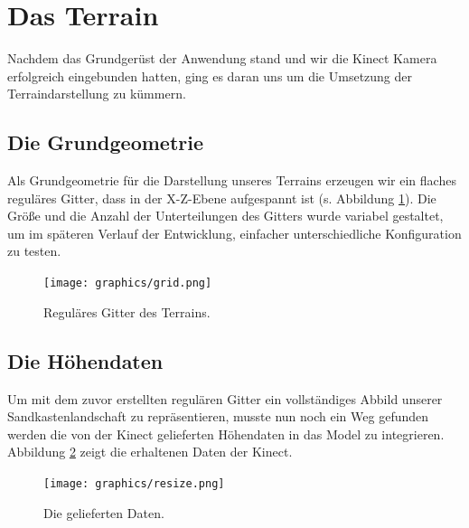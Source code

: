 \section{Das Terrain}
\begin{Spacing}{\mylinespace}

Nachdem das Grundgerüst der Anwendung stand und wir die Kinect Kamera erfolgreich eingebunden hatten, ging es daran uns um die Umsetzung der Terraindarstellung zu kümmern.

\subsection{Die Grundgeometrie}
Als Grundgeometrie für die Darstellung unseres Terrains erzeugen wir ein flaches reguläres Gitter, dass in der X-Z-Ebene aufgespannt ist (s. Abbildung \ref{fig:grid}). Die Größe und die Anzahl der Unterteilungen des Gitters wurde variabel gestaltet, um im späteren Verlauf der Entwicklung, einfacher unterschiedliche Konfiguration zu testen. 

\begin{figure}[h!]
	\centering
	\vspace*{10px}
	\texttt{[image: graphics/grid.png]}
	\caption{Reguläres Gitter des Terrains.}
	\label{fig:grid}
\end{figure}

\subsection{Die Höhendaten}
Um mit dem zuvor erstellten regulären Gitter ein vollständiges Abbild unserer Sandkastenlandschaft zu repräsentieren, musste nun noch ein Weg gefunden werden die von der Kinect gelieferten Höhendaten in das Model zu integrieren. Abbildung \ref{fig:resize} zeigt die erhaltenen Daten der Kinect.
\\
\begin{figure}[h!]
	\centering
	\texttt{[image: graphics/resize.png]}
	\caption{Die gelieferten Daten.}
	\label{fig:resize}
\end{figure}  


\end{Spacing}
